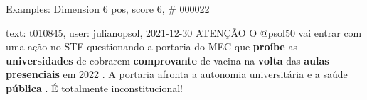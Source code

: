 \begin{frame}{Examples: Dimension 6 pos, score 6, \# 000022}
\footnotesize
\begin{exampleblock}{text: t010845, user: julianopsol, 2021-12-30}
ATENÇÃO O @psol50 vai entrar com uma ação no STF questionando a portaria do MEC 
que \textbf{proíbe} as \textbf{universidades} de cobrarem \textbf{comprovante} 
de vacina na \textbf{volta} das \textbf{aulas} \textbf{presenciais} em 2022 . A 
portaria afronta a autonomia universitária e a saúde \textbf{pública} . É 
totalmente inconstitucional! 
\end{exampleblock}
\end{frame}
